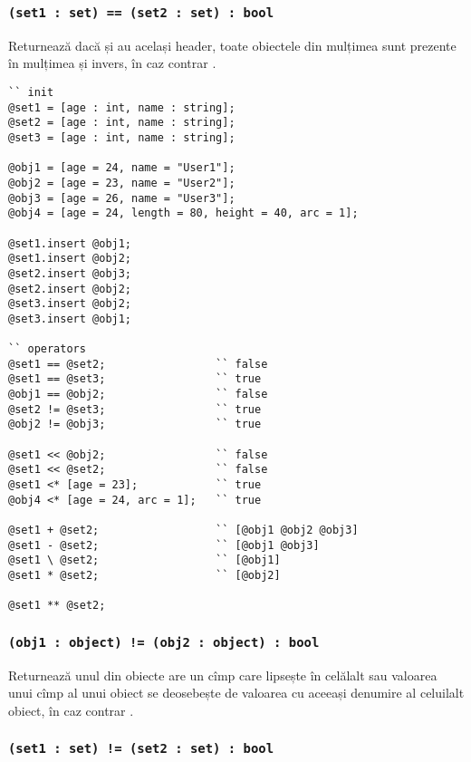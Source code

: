 \subsubsection{\lstinline|(set1 : set) == (set2 : set) : bool|}

Returnează \true{} dacă  și  au același header, toate obiectele din mulțimea  sunt prezente în mulțimea  și invers, în caz contrar \false{}.

\begin{lstlisting}[caption=Exemple de folosire al operatorilor asupra tipului object și set, label=setobjopex]
`` init
@set1 = [age : int, name : string];
@set2 = [age : int, name : string];
@set3 = [age : int, name : string];

@obj1 = [age = 24, name = "User1"];
@obj2 = [age = 23, name = "User2"];
@obj3 = [age = 26, name = "User3"];
@obj4 = [age = 24, length = 80, height = 40, arc = 1];

@set1.insert @obj1;
@set1.insert @obj2;
@set2.insert @obj3;
@set2.insert @obj2;
@set3.insert @obj2;
@set3.insert @obj1;

`` operators
@set1 == @set2;					`` false
@set1 == @set3;					`` true
@obj1 == @obj2;					`` false
@set2 != @set3;					`` true
@obj2 != @obj3;					`` true

@set1 << @obj2;					`` false
@set1 << @set2;					`` false
@set1 <* [age = 23];			`` true
@obj4 <* [age = 24, arc = 1];	`` true

@set1 + @set2;					`` [@obj1 @obj2 @obj3]
@set1 - @set2;					`` [@obj1 @obj3]
@set1 \ @set2;					`` [@obj1]
@set1 * @set2;					`` [@obj2]

@set1 ** @set2;	
\end{lstlisting}

\subsubsection{\lstinline|(obj1 : object) != (obj2 : object) : bool|}

Returnează \true{} unul din obiecte are un cîmp care lipsește în celălalt sau valoarea unui cîmp al unui obiect se deosebește de valoarea cu aceeași denumire al celuilalt obiect, în caz contrar \false{}.

\subsubsection{\lstinline|(set1 : set) != (set2 : set) : bool|}


